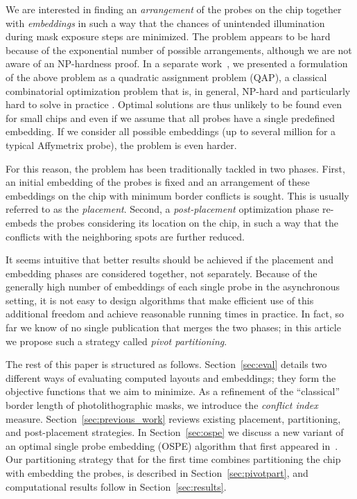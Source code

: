 \documentclass{llncs}
\begin{document}
We are interested in finding an \emph{arrangement} of the probes on the chip
together with \emph{embeddings} in such a way that the chances of unintended
illumination during mask exposure steps are minimized. The problem appears to
be hard because of the exponential number of possible arrangements, although
we are not aware of an NP-hardness proof.  In a separate
work~\cite{CARVALHO06}, we presented a formulation of the above problem as a
quadratic assignment problem (QAP), a classical combinatorial optimization
problem that is, in general, NP-hard and particularly hard to solve in
practice \cite{CELA98}. Optimal solutions are thus unlikely to be found even
for small chips and even if we assume that all probes have a single predefined
embedding. If we consider all possible embeddings (up to several million for a
typical Affymetrix probe), the problem is even harder.


For this reason, the problem has been traditionally tackled in two phases.
First, an initial embedding of the probes is fixed and an arrangement of these
embeddings on the chip with minimum border conflicts is sought. This is
usually referred to as the \emph{placement}. Second, a \emph{post-placement}
optimization phase re-embeds the probes considering its location on the chip,
in such a way that the conflicts with the neighboring spots are further
reduced.

It seems intuitive that better results should be achieved if the placement and
embedding phases are considered together, not separately. Because of the
generally high number of embeddings of each single probe in the asynchronous
setting, it is not easy to design algorithms that make efficient use of this
additional freedom and achieve reasonable running times in practice. In fact,
so far we know of no single publication that merges the two phases; in this
article we propose such a strategy called \emph{pivot partitioning}.

The rest of this paper is structured as follows. Section~\ref{sec:eval}
details two different ways of evaluating computed layouts and embeddings; they
form the objective functions that we aim to minimize. As a refinement of the
``classical'' border length of photolithographic masks, we introduce the
\emph{conflict index} measure. Section~\ref{sec:previous_work} reviews
existing placement, partitioning, and post-placement strategies.  In
Section~\ref{sec:ospe} we discuss a new variant of an optimal single probe
embedding (OSPE) algorithm that first appeared in~\cite{KAHNG02}. Our
partitioning strategy that for the first time combines partitioning the chip
with embedding the probes, is described in Section~\ref{sec:pivotpart}, and
computational results follow in Section~\ref{sec:results}.
\end{document}
